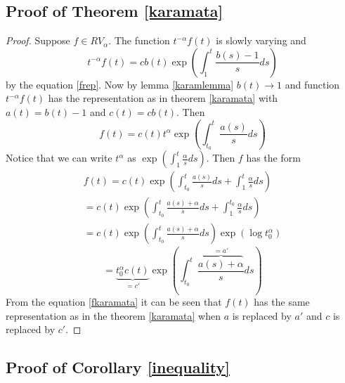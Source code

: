 \documentclass[english,12pt,a4paper,pdftex,sci,utf8]{aaltothesis} %
\begin{document}
\subsection{Proof of Theorem \ref{karamata}}

\begin{proof}
Suppose $f \in RV_{\alpha}$. The function $t^{-\alpha}f(t)$ is slowly varying and
\begin{equation*}
t^{-\alpha}f(t) = cb(t) \exp \left( \int_{1}^{t} \frac{b(s)-1}{s}ds \right)
\end{equation*}
by the equation \ref{frep}. Now by lemma \ref{karamlemma} $b(t) \rightarrow 1$ and function $t^{-\alpha}f(t)$ has the representation as in theorem \ref{karamata} with $a(t)=b(t)-1$ and $c(t)=cb(t)$. Then
\begin{equation*}
f(t) = c(t)t^{\alpha} \exp \left(  \int_{t_0}^{t} \frac{a(s)}{s}ds  \right)
\end{equation*}
Notice that we can write $t^{\alpha}$ as $\exp \left(  \int_{1}^{t} \frac{\alpha}{s}ds  \right)$. Then $f$ has the form
\begin{equation*}
\begin{split}
f(t) = c(t) \exp \left(  \int_{t_0}^{t} \frac{a(s)}{s}ds + \int_{1}^{t} \frac{\alpha}{s}ds  \right) \\
= c(t) \exp \left(  \int_{t_0}^{t} \frac{a(s)+\alpha}{s}ds + \int_{1}^{t_0} \frac{\alpha}{s}ds  \right)\\
= c(t) \exp \left(  \int_{t_0}^{t} \frac{a(s)+\alpha}{s}ds \right) \exp \left( \log t_0^{\alpha}  \right)
\end{split}
\end{equation*}
\begin{equation}
= \underbrace{t_0^{\alpha}c(t)}_{=c'} \exp \left(  \int_{t_0}^{t} \frac{\overbrace{a(s)+\alpha}^{=a'}}{s}ds \right)
\label{fkaramata}
\end{equation}
From the equation \ref{fkaramata} it can be seen that $f(t)$ has the same representation as in the theorem \ref{karamata} when $a$ is replaced by $a'$ and $c$ is replaced by $c'$.
\end{proof}

\subsection{Proof of Corollary \ref{inequality}}
\end{document}
